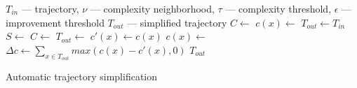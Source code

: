 \begin{algorithm}
  \begin{algorithmic}[1]
	  \Require $T_{in}$ --- trajectory, $\nu$ --- complexity neighborhood, $\tau$ --- complexity threshold, $\epsilon$ --- improvement threshold
	  \Ensure $T_{out}$ --- simplified trajectory
			\State $C \gets$  
			\State $c(x) \gets$ 
			\State
			\State $T_{out} \gets T_{in}$
			\Repeat
			  \State $S \gets$ 
				\State $C \gets$ 
			  \State
					\State $T_{out} \gets$ 
			  \EndFor
				\State
				\State $c'(x) \gets c(x)$ %
				\State $c(x) \gets$ 
				\State
				\State $\Delta c \gets \sum_{x \in T_{out}}{max(c(x) - c'(x), 0)}$
				\State {}
			\State
			\State \Return $T_{out}$
		\EndProcedure
  \end{algorithmic}
	\caption{Automatic trajectory simplification}
  \label{alg:auto-simplify}
\end{algorithm}